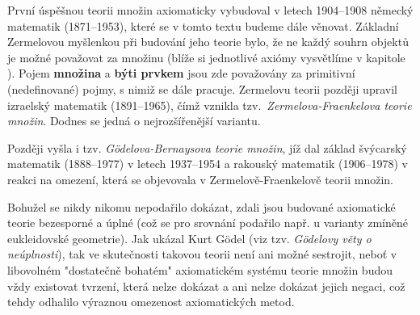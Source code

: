 První úspěšnou teorii množin axiomaticky vybudoval v letech 1904--1908 německý matematik  (1871--1953), které se v tomto textu budeme dále věnovat. Základní Zermelovou myšlenkou při budování jeho teorie bylo, že ne každý souhrn objektů je možné považovat za množinu (blíže si jednotlivé axiómy vysvětlíme v kapitole ). Pojem \textbf{množina} a \textbf{býti prvkem} jsou zde považovány za primitivní (nedefinované) pojmy, s nimiž se dále pracuje. Zermelovu teorii později upravil izraelský matematik  (1891--1965), čímž vznikla tzv.~\emph{Zermelova-Fraenkelova teorie množin}. Dodnes se jedná o nejrozšířenější variantu.\par
Později vyšla i tzv. \emph{Gödelova-Bernaysova teorie množin}, jíž dal základ švýcarský matematik  (1888--1977) v letech 1937--1954 a rakouský matematik  (1906--1978) v reakci na omezení, která se objevovala v Zermelově-Fraenkelově teorii množin.

Bohužel se nikdy nikomu nepodařilo dokázat, zdali jsou budované axiomatické teorie bezesporné a úplné (což se pro srovnání podařilo např. u varianty zmíněné eukleidovské geometrie). Jak ukázal Kurt Gödel (viz tzv. \emph{Gödelovy věty o neúplnosti}), tak ve skutečnosti takovou teorii není ani možné sestrojit, neboť v libovolném "dostatečně bohatém" axiomatickém systému teorie množin budou vždy existovat tvrzení, která nelze dokázat a ani nelze dokázat jejich negaci, což tehdy odhalilo výraznou omezenost axiomatických metod. 